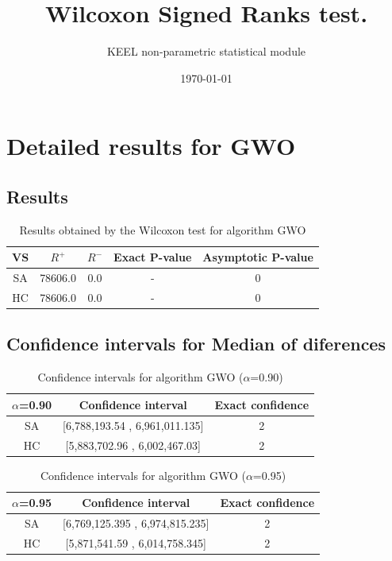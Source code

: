 \documentclass[a4paper,10pt]{article}
\title{Wilcoxon Signed Ranks test.}
\date{\today}
\author{KEEL non-parametric statistical module}
\begin{document}
\pagestyle{empty}
\maketitle
\thispagestyle{empty}



\section{Detailed results for GWO}


\subsection{Results}

\begin{table}[!htp]
\centering\small
\begin{tabular}{
|c|c|c|c|c|}
\hline
 VS & $R^{+}$ & $R^{-}$ & Exact P-value & Asymptotic P-value \\ \hline 
SA & 78606.0 & 0.0 & - & 0\\ \hline 
HC & 78606.0 & 0.0 & - & 0\\ \hline 

\end{tabular}
\caption{Results obtained by the Wilcoxon test for algorithm GWO}
\end{table}

\subsection{Confidence intervals for Median of diferences}

\begin{table}[!htp]
\centering\small
\begin{tabular}{
|c|c|c|}
\hline
 $\alpha$=0.90 & Confidence interval & Exact confidence \\ \hline 
SA & [6,788,193.54 , 6,961,011.135] & 2\\ \hline 
HC & [5,883,702.96 , 6,002,467.03] & 2\\ \hline 

\end{tabular}
\caption{Confidence intervals for algorithm GWO ($\alpha$=0.90)}
\end{table}
\begin{table}[!htp]
\centering\small
\begin{tabular}{
|c|c|c|}
\hline
 $\alpha$=0.95 & Confidence interval & Exact confidence \\ \hline 
SA & [6,769,125.395 , 6,974,815.235] & 2\\ \hline 
HC & [5,871,541.59 , 6,014,758.345] & 2\\ \hline 

\end{tabular}
\caption{Confidence intervals for algorithm GWO ($\alpha$=0.95)}
\end{table}
\end{document}
